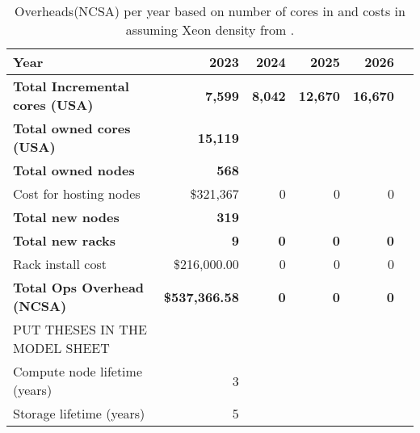 \tiny \begin{longtable} { |p{}  |r  |r  |r  |r  |r |} 
\caption{Overheads(NCSA) per year based on number of cores in  and costs in  assuming Xeon density from .  \label{tab:opsOverheadCost}}\\ 
\hline 
\textbf{Year}&\textbf{2023}&\textbf{2024}&\textbf{2025}&\textbf{2026} \\ \hline
\textbf{Total Incremental cores (USA)}&\textbf{7,599}&\textbf{8,042}&\textbf{12,670}&\textbf{16,670} \\ \hline
\textbf{Total owned cores (USA)}&\textbf{15,119}&&& \\ \hline
\textbf{Total owned nodes}&\textbf{568}&&& \\ \hline
{Cost for hosting nodes}&{\$321,367}&{0}&{0}&{0} \\ \hline
\textbf{Total new nodes}&\textbf{319}&&& \\ \hline
\textbf{Total new racks}&\textbf{9}&\textbf{0}&\textbf{0}&\textbf{0} \\ \hline
{Rack install cost }&{\$216,000.00}&{0}&{0}&{0} \\ \hline
\textbf{Total Ops Overhead (NCSA)}&\textbf{\$537,366.58}&\textbf{0}&\textbf{0}&\textbf{0} \\ \hline
{PUT THESES IN THE MODEL SHEET}&&&& \\ \hline
{Compute node lifetime (years)}&{3}&&& \\ \hline
{Storage lifetime (years)}&{5}&&& \\ \hline
\end{longtable} \normalsize
